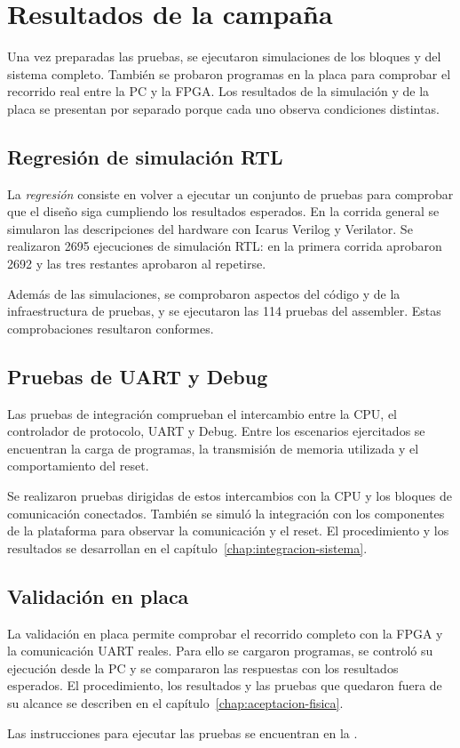 \section{Resultados de la campaña}

Una vez preparadas las pruebas, se ejecutaron simulaciones de los bloques y del
sistema completo. También se probaron programas en la placa para comprobar el
recorrido real entre la PC y la FPGA. Los resultados de la simulación y de la
placa se presentan por separado porque cada uno observa condiciones distintas.

\subsection{Regresión de simulación RTL}

La \emph{regresión} consiste en volver a ejecutar un conjunto de pruebas para
comprobar que el diseño siga cumpliendo los resultados esperados. En la corrida
general se simularon las descripciones del hardware con Icarus Verilog y
Verilator. Se realizaron 2695 ejecuciones de simulación RTL: en la primera
corrida aprobaron 2692 y las tres restantes aprobaron al repetirse.

Además de las simulaciones, se comprobaron aspectos del código y de la
infraestructura de pruebas, y se ejecutaron las 114 pruebas del assembler.
Estas comprobaciones resultaron conformes.

\subsection{Pruebas de UART y Debug}

Las pruebas de integración comprueban el intercambio entre la CPU, el
controlador de protocolo, UART y Debug. Entre los escenarios ejercitados se
encuentran la carga de programas, la transmisión de memoria utilizada y el
comportamiento del reset.

Se realizaron pruebas dirigidas de estos intercambios con la CPU y los bloques
de comunicación conectados. También se simuló la integración con los componentes
de la plataforma para observar la comunicación y el reset. El procedimiento y
los resultados se desarrollan en el capítulo~\ref{chap:integracion-sistema}.

\subsection{Validación en placa}

La validación en placa permite comprobar el recorrido completo con la FPGA y la
comunicación UART reales. Para ello se cargaron programas, se controló su
ejecución desde la PC y se compararon las respuestas con los resultados
esperados. El procedimiento, los resultados y las pruebas que quedaron fuera de
su alcance se describen en el capítulo~\ref{chap:aceptacion-fisica}.

Las instrucciones para ejecutar las pruebas se encuentran en la
.

